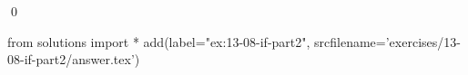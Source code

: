 
\begin{ex}
  \label{ex:13-08-if-part2}
  
  \qed
\end{ex}
\begin{python0}
from solutions import *
add(label="ex:13-08-if-part2",
    srcfilename='exercises/13-08-if-part2/answer.tex')
\end{python0}
